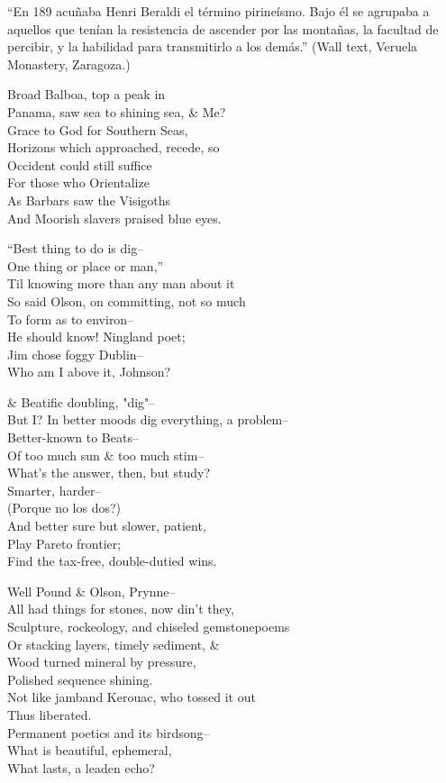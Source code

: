 ``En 189 acuñaba Henri Beraldi el término pirineísmo. Bajo él se agrupaba a aquellos que tenían la resistencia de ascender por las montañas, la facultad de percibir, y la habilidad para transmitirlo a los demás.'' (Wall text, Veruela Monastery, Zaragoza.)

Broad Balboa, top a peak in \\
Panama, saw sea to shining sea, \& Me? \\
Grace to God for Southern Seas, \\
Horizons which approached, recede, so \\
Occident could still suffice \\
For those who Orientalize \\
As Barbars saw the Visigoths \\
And Moorish slavers praised blue eyes.

``Best thing to do is dig-- \\
One thing or place or man,'' \\
Til knowing more than any man about it \\
So said Olson, on committing, not so much \\
To form as to environ-- \\
He should know! Ningland poet; \\
Jim chose foggy Dublin-- \\
Who am I above it, Johnson?

\& Beatific doubling, "dig"-- \\
But I? In better moods dig everything, a problem-- \\
Better-known to Beats-- \\
Of too much sun \& too much stim-- \\
What's the answer, then, but study? \\
Smarter, harder-- \\
(Porque no los dos?) \\
And better sure but slower, patient, \\
Play Pareto frontier; \\
Find the tax-free, double-dutied wins.

Well Pound \& Olson, Prynne-- \\
All had things for stones, now din't they, \\
Sculpture, rockeology, and chiseled gemstonepoems \\
Or stacking layers, timely sediment, \& \\
Wood turned mineral by pressure, \\
Polished sequence shining. \\
Not like jamband Kerouac, who tossed it out \\
Thus liberated. \\
Permanent poetics and its birdsong-- \\
What is beautiful, ephemeral, \\
What lasts, a leaden echo?

